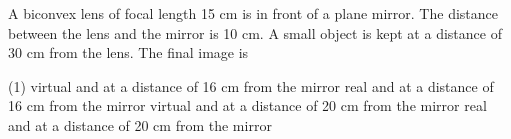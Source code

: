
\item A biconvex lens of focal length 15 cm is in front of a plane mirror. The distance between the lens and the mirror is 10 cm. A small object is kept at a distance of 30 cm from the lens. The final image is
    \begin{tasks}(1)
        \task virtual and at a distance of 16 cm from the mirror
        \task real and at a distance of 16 cm from the mirror\ans
        \task virtual and at a distance of 20 cm from the mirror
        \task real and at a distance of 20 cm from the mirror
    \end{tasks}
